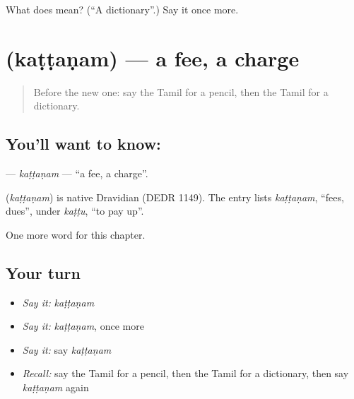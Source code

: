 \begin{tcolorbox}[breakable,colback=teal!4,colframe=teal!35!black,title={Before you move on}]
What does  mean? (\textquotedblleft{}A dictionary\textquotedblright{}.) Say it once more.
\end{tcolorbox}
\section[\texorpdfstring{\ta{கட்டணம்} (kaṭṭaṇam)}{கட்டணம் (kaṭṭaṇam)}]{ (kaṭṭaṇam) — a fee, a charge}

\label{lesson:TA-C215-kattanam}



\begin{quote}
Before the new one: say the Tamil for a pencil, then the Tamil for a dictionary.
\end{quote}

\subsection*{You'll want to know: }
\textbf{} — \emph{kaṭṭaṇam} — \textquotedblleft{}a fee, a charge\textquotedblright{}.

\begin{cousinweb}
\textbf{} (\emph{kaṭṭaṇam}) is native Dravidian (DEDR 1149). The entry lists \emph{kaṭṭaṇam}, \textquotedblleft{}fees, dues\textquotedblright{}, under \emph{kaṭṭu}, \textquotedblleft{}to pay up\textquotedblright{}.
\end{cousinweb}

\begin{grammarlens}[title={What you've built}]
One more word for this chapter.
\end{grammarlens}

\subsection*{Your turn}
\begin{itemize}
\raggedright
  \item \emph{Say it:} \emph{kaṭṭaṇam}
  \item \emph{Say it:} \emph{kaṭṭaṇam}, once more
  \item \emph{Say it:} say \emph{kaṭṭaṇam}
  \item \emph{Recall:} say the Tamil for a pencil, then the Tamil for a dictionary, then say \emph{kaṭṭaṇam} again
\end{itemize}

